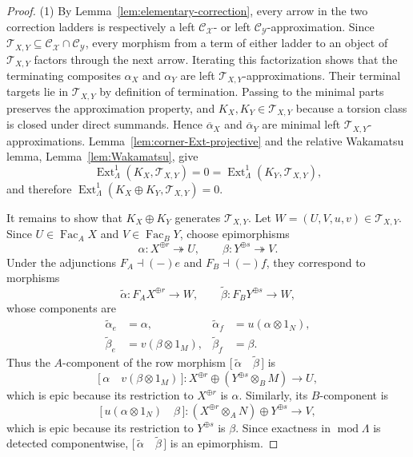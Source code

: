 \documentclass[11pt,reqno]{amsart}
\theoremstyle{definition}
\theoremstyle{remark}
\newcommand{\modu}{\operatorname{mod}}
\newcommand{\Fac}{\operatorname{Fac}}
\newcommand{\Ext}{\operatorname{Ext}}
\numberwithin{equation}{section}
\begin{document}
\begin{proof}
\textup{(1)} By Lemma~\ref{lem:elementary-correction}, every arrow in the
two correction ladders is respectively a left
$\mathcal C_{\mathcal X}$- or left
$\mathcal C_{\mathcal Y}$-approximation.  Since
$\mathcal T_{X,Y}\subseteq\mathcal C_{\mathcal X}\cap
\mathcal C_{\mathcal Y}$, every morphism from a term of either ladder to
an object of $\mathcal T_{X,Y}$ factors through the next arrow.  Iterating
this factorization shows that the terminating composites $\alpha_X$ and
$\alpha_Y$ are left $\mathcal T_{X,Y}$-approximations.  Their terminal
targets lie in $\mathcal T_{X,Y}$ by definition of termination.  Passing
to the minimal parts preserves the approximation property, and
$K_X,K_Y\in\mathcal T_{X,Y}$ because a torsion class is closed under
direct summands.  Hence $\overline\alpha_X$ and
$\overline\alpha_Y$ are minimal left $\mathcal T_{X,Y}$-approximations.
Lemma~\ref{lem:corner-Ext-projective} and the relative Wakamatsu lemma,
Lemma~\ref{lem:Wakamatsu}, give
\[
 \Ext^1_\Lambda(K_X,\mathcal T_{X,Y})=0
 =\Ext^1_\Lambda(K_Y,\mathcal T_{X,Y}),
\]
and therefore
$\Ext^1_\Lambda(K_X\oplus K_Y,\mathcal T_{X,Y})=0$.

It remains to show that $K_X\oplus K_Y$ generates $\mathcal T_{X,Y}$.
Let $W=(U,V,u,v)\in\mathcal T_{X,Y}$.  Since
$U\in\Fac_AX$ and $V\in\Fac_BY$, choose epimorphisms
\[
 \alpha:X^{\oplus r}\twoheadrightarrow U,
 \qquad
 \beta:Y^{\oplus s}\twoheadrightarrow V.
\]
Under the adjunctions $F_A\dashv(-)e$ and $F_B\dashv(-)f$, they correspond
to morphisms
\[
 \widetilde\alpha:F_AX^{\oplus r}\longrightarrow W,
 \qquad
 \widetilde\beta:F_BY^{\oplus s}\longrightarrow W,
\]
whose components are
\begin{align*}
 \widetilde\alpha_e&=\alpha,
 &\widetilde\alpha_f&=u(\alpha\otimes1_N),\\
 \widetilde\beta_e&=v(\beta\otimes1_M),
 &\widetilde\beta_f&=\beta.
\end{align*}
Thus the $A$-component of the row morphism
$\bigl[\,\widetilde\alpha\quad\widetilde\beta\,\bigr]$ is
\[
 \bigl[\,\alpha\quad v(\beta\otimes1_M)\,\bigr]:
 X^{\oplus r}\oplus(Y^{\oplus s}\otimes_BM)\longrightarrow U,
\]
which is epic because its restriction to $X^{\oplus r}$ is $\alpha$.
Similarly, its $B$-component is
\[
 \bigl[\,u(\alpha\otimes1_N)\quad\beta\,\bigr]:
 (X^{\oplus r}\otimes_AN)\oplus Y^{\oplus s}\longrightarrow V,
\]
which is epic because its restriction to $Y^{\oplus s}$ is $\beta$.
Since exactness in $\modu\Lambda$ is detected componentwise,
$\bigl[\,\widetilde\alpha\quad\widetilde\beta\,\bigr]$ is an epimorphism.


\end{proof}
\end{document}
